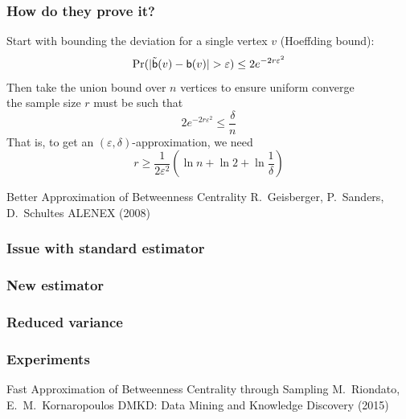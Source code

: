 \begin{frame}
  \frametitle{How do they prove it?}
  Start with bounding the deviation for a single vertex $v$ (Hoeffding bound):
  \[
    \Pr(|\tilde{\betw}(v)-\betw(v)|>\varepsilon)\le 2e^{-2r\varepsilon^2}
  \]
  \vfill
  Then take the union bound over $n$ vertices to ensure uniform converge\\
  \quad the sample size $r$ must be such that
  \[
    2e^{-2r\varepsilon^2}\le\frac{\delta}{n}
  \]
  That is, to get an $(\varepsilon,\delta)$-approximation, we need
  \[
    r\ge\frac{1}{2\varepsilon^2}\left(\ln n + \ln 2 +
    \ln\frac{1}{\delta}\right)
  \]
\end{frame}

\begin{frame}
  \centering
  \vfill
  {\huge Better Approximation of Betweenness Centrality}
  \vfill
  {\Large R.~Geisberger, P.~Sanders, D.~Schultes}
  \vfill
  {\large ALENEX (2008)}
  \vfill
\end{frame}

\begin{frame}
  \frametitle{Issue with standard estimator}
\end{frame}

\begin{frame}
  \frametitle{New estimator}
\end{frame}

\begin{frame}
  \frametitle{Reduced variance}
\end{frame}

\begin{frame}
  \frametitle{Experiments}
\end{frame}

\begin{frame}
  \centering
  \vfill
  {\huge Fast Approximation of Betweenness Centrality through Sampling}
  \vfill
  {\Large M.~Riondato, E.~M.~Kornaropoulos}
  \vfill
  {\large DMKD: Data Mining and Knowledge Discovery (2015)}
  \vfill
\end{frame}

